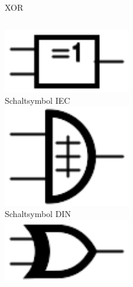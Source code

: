\begin{frame}{XOR}
  \begin{columns}
    \includegraphics[width=\textwidth,height=.2\textheight,keepaspectratio]{a14/XOR_IEC.pdf}\\
    {\small Schaltsymbol IEC}\\
    \includegraphics[width=\textwidth,height=.2\textheight,keepaspectratio]{a14/XOR_DIN.pdf}\\
    {\small Schaltsymbol DIN}\\
    \includegraphics[width=\textwidth,height=.2\textheight,keepaspectratio]{a14/XOR_ANSI.pdf}\\

\end{columns}
\end{frame}

